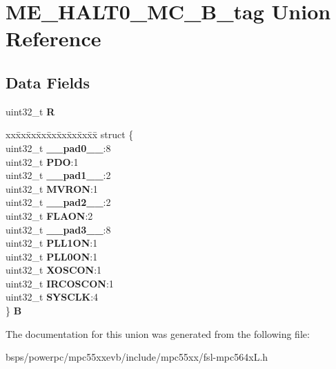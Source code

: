 \hypertarget{unionME__HALT0__MC__32B__tag}{}\section{M\+E\+\_\+\+H\+A\+L\+T0\+\_\+\+M\+C\+\_\+B\+\_\+tag Union Reference}
\label{unionME__HALT0__MC__32B__tag}
\subsection*{Data Fields}
\begin{DoxyCompactItemize}
\item 
\mbox{\label{unionME__HALT0__MC__32B__tag_afd75c705e5c1dfe5efd70d8cfe3c5742}} 
uint32\+\_\+t {\bfseries R}
\item 
\mbox{\label{unionME__HALT0__MC__32B__tag_ae51edc675bf07b098ecabde4bc7757be}} 
\begin{tabbing}
xx\=xx\=xx\=xx\=xx\=xx\=xx\=xx\=xx\=\kill
struct \{\\
\>uint32\_t {\bfseries \_\_pad0\_\_}:8\\
\>uint32\_t {\bfseries PDO}:1\\
\>uint32\_t {\bfseries \_\_pad1\_\_}:2\\
\>uint32\_t {\bfseries MVRON}:1\\
\>uint32\_t {\bfseries \_\_pad2\_\_}:2\\
\>uint32\_t {\bfseries FLAON}:2\\
\>uint32\_t {\bfseries \_\_pad3\_\_}:8\\
\>uint32\_t {\bfseries PLL1ON}:1\\
\>uint32\_t {\bfseries PLL0ON}:1\\
\>uint32\_t {\bfseries XOSCON}:1\\
\>uint32\_t {\bfseries IRCOSCON}:1\\
\>uint32\_t {\bfseries SYSCLK}:4\\
\} {\bfseries B}\\

\end{tabbing}\end{DoxyCompactItemize}


The documentation for this union was generated from the following file\+:\begin{DoxyCompactItemize}
\item 
bsps/powerpc/mpc55xxevb/include/mpc55xx/fsl-\/mpc564x\+L.\+h\end{DoxyCompactItemize}
